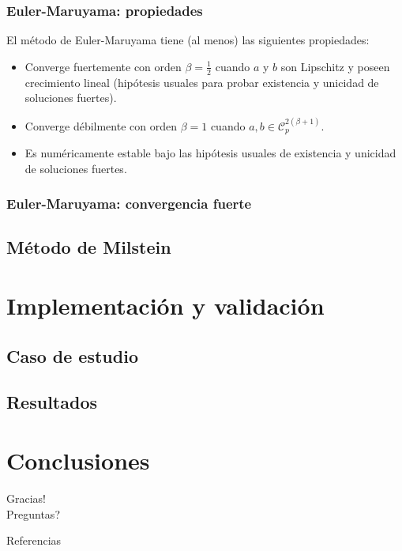 \documentclass[10pt]{beamer}
\begin{document}
\frame
{
    \frametitle{Euler-Maruyama: propiedades}

    El método de Euler-Maruyama tiene (al menos) las siguientes propiedades:

    \begin{itemize}
        \item<2-> Converge fuertemente con orden $\beta = \frac{1}{2}$
        cuando $a$ y $b$ son Lipschitz y poseen crecimiento lineal (hipótesis usuales para
        probar existencia y unicidad de soluciones fuertes).

        \item<3-> Converge débilmente con orden $\beta = 1$ cuando $a, b \in \mathcal{C}^{2(\beta+1)}_p$.

        \item<4-> Es numéricamente estable bajo las hipótesis usuales de existencia y unicidad
        de soluciones fuertes.
    \end{itemize}

}

\frame
{
    \frametitle{Euler-Maruyama: convergencia fuerte}
}


\subsection{Método de Milstein}




\section{Implementación y validación}


\subsection{Caso de estudio}

\subsection{Resultados}


\section{Conclusiones}



\begin{frame}[standout]
  Gracias!\\
  
  Preguntas?
\end{frame}

\nocite{*}
\begin{frame}[allowframebreaks]{Referencias}
  
  
\end{frame}
\end{document}
